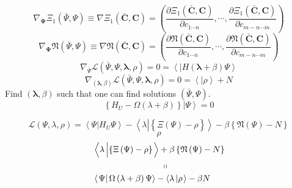 \documentclass[prl,twocolumn]{revtex4}%
\begin{document}
\begin{equation}
\nabla_{\mathbf{\Psi}}\Xi_{1}\left(  \bar{\Psi},\Psi\right)  \equiv\nabla
\Xi_{1}\left(  \mathbf{\bar{C}},\mathbf{C}\right)  =\left(  \frac{\partial
\Xi_{1}\left(  \mathbf{\bar{C}},\mathbf{C}\right)  }{\partial c_{1\cdots n}%
},\cdots,\frac{\partial\Xi_{1}\left(  \mathbf{\bar{C}},\mathbf{C}\right)
}{\partial c_{m-n\cdots m}}\right)
\end{equation}%
\begin{equation}
\nabla_{\mathbf{\Psi}}\mathfrak{N}\left(  \bar{\Psi},\Psi\right)  \equiv
\nabla\mathfrak{N}\left(  \mathbf{\bar{C}},\mathbf{C}\right)  =\left(
\frac{\partial\mathfrak{N}\left(  \mathbf{\bar{C}},\mathbf{C}\right)
}{\partial c_{1\cdots n}},\cdots,\frac{\partial\mathfrak{N}\left(
\mathbf{\bar{C}},\mathbf{C}\right)  }{\partial c_{m-n\cdots m}}\right)
\end{equation}%
\begin{equation}
\nabla_{\bar{\Psi}}\mathcal{L}\left(  \bar{\Psi},\Psi,\mathbf{\lambda}%
,\rho\right)  =0=\left\langle \left.  {}\right\vert H\left(  \mathbf{\lambda
}+\beta\right)  \Psi\right\rangle
\end{equation}%
\begin{equation}
\nabla_{\left(  \mathbf{\lambda},\beta\right)  }\mathcal{L}\left(  \bar{\Psi
},\Psi,\mathbf{\lambda},\rho\right)  =0=\left\langle \left.  {}\right\vert
\rho\right\rangle +N
\end{equation}
Find $\left(  \mathbf{\lambda},\beta\right)  $ such that one can find
solutions $\left(  \bar{\Psi},\Psi\right)  .$
\begin{equation}
\left\{  H_{U}-\Omega\left(  \lambda+\beta\right)  \right\}  \left\vert
\Psi\right\rangle =0
\end{equation}
%

\[
\mathcal{L}\left(  \Psi,\lambda,\rho\right)  =\left\langle \left.
\Psi\right\vert H_{U}\Psi\right\rangle -\left\langle \lambda\left\vert
\left\{  \overset{}{\Xi\left(  \Psi\right)  -\rho}\right\}  \right.
\right\rangle -\beta\left\{  \mathfrak{N}\left(  \Psi\right)  -N\right\}
\]%
\[
\rho
\]%
\begin{align*}
&  \left\langle \lambda\left\vert \overset{}{\left\{  \Xi\left(  \Psi\right)
-\rho\right\}  }\right.  \right\rangle +\beta\left\{  \mathfrak{N}\left(
\Psi\right)  -N\right\} \\
&  \qquad\qquad\qquad\qquad\left.  \shortparallel\right. \\
&  \left\langle \left.  \Psi\right\vert \Omega\left(  \lambda+\beta\right)
\Psi\right\rangle -\left\langle \lambda\left\vert \rho\right.  \right\rangle
-\beta N
\end{align*}
%
\end{document}
